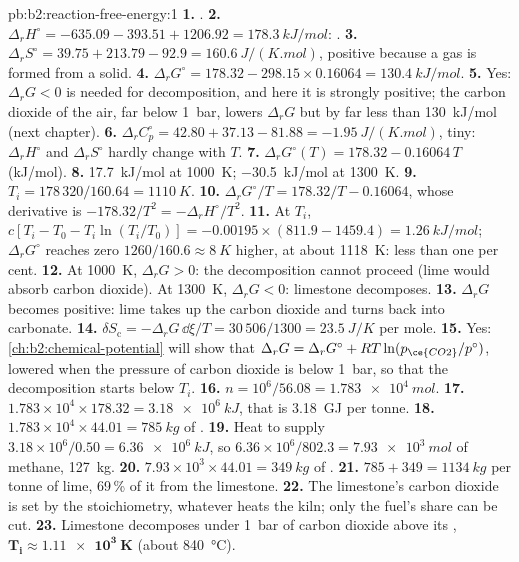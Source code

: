 \begin{solution}{pb:b2:reaction-free-energy:1}
\textbf{1.} .
\textbf{2.} $\Delta_r H^\circ = -635.09 - 393.51 + 1206.92 =
\qty{+178.3}{kJ/mol}$: .
\textbf{3.} $\Delta_r S^\circ = 39.75 + 213.79 - 92.9 = \qty{+160.6}{J/(K.mol)}$,
positive because a gas is formed from a solid.
\textbf{4.} $\Delta_r G^\circ = 178.32 - 298.15 \times 0.16064 =
\qty{+130.4}{kJ/mol}$.
\textbf{5.} Yes: $\Delta_r G < 0$ is needed for decomposition, and here it
is strongly positive; the carbon dioxide of the air, far below \qty{1}{bar},
lowers $\Delta_r G$ but by far less than \qty{130}{kJ/mol} (next chapter).
\textbf{6.} $\Delta_r C^\circ_p = 42.80 + 37.13 - 81.88 =
\qty{-1.95}{J/(K.mol)}$, tiny: $\Delta_r H^\circ$ and $\Delta_r S^\circ$
hardly change with $T$.
\textbf{7.} $\Delta_r G^\circ(T) = 178.32 - 0.16064\,T$ (\unit{kJ/mol}).
\textbf{8.} \qty{+17.7}{kJ/mol} at \qty{1000}{K}; \qty{-30.5}{kJ/mol} at
\qty{1300}{K}.
\textbf{9.} $T_i = 178\,320/160.64 = \qty{1110}{K}$.
\textbf{10.} $\Delta_r G^\circ/T = 178.32/T - 0.16064$, whose derivative is
$-178.32/T^2 = -\Delta_r H^\circ/T^2$.
\textbf{11.} At $T_i$, $c[T_i - T_0 - T_i\ln(T_i/T_0)] = -0.00195 \times
(811.9 - 1459.4) = \qty{+1.26}{kJ/mol}$; $\Delta_r G^\circ$ reaches zero
$1260/160.6 \approx \qty{8}{K}$ higher, at about \qty{1118}{K}: less than
one per cent.
\textbf{12.} At \qty{1000}{K}, $\Delta_r G > 0$: the decomposition cannot
proceed (lime would absorb carbon dioxide). At \qty{1300}{K}, $\Delta_r G <
0$: limestone decomposes.
\textbf{13.} $\Delta_r G$ becomes positive: lime takes up the carbon dioxide
and turns back into carbonate.
\textbf{14.} $\delta S_{\text{c}} = -\Delta_r G\,\dd\xi/T = 30\,506/1300 =
\qty{23.5}{J/K}$ per mole.
\textbf{15.} Yes: \cref{ch:b2:chemical-potential} will show that
$\Delta_r G = \Delta_r G^\circ + RT\ln(p_{\ce{CO2}}/p^\circ)$, lowered
when the pressure of carbon dioxide is below \qty{1}{bar}, so that the
decomposition starts below $T_i$.
\textbf{16.} $n = 10^6/56.08 = \qty{1.783e4}{mol}$.
\textbf{17.} $1.783 \times 10^4 \times 178.32 = \qty{3.18e6}{kJ}$, that is
\qty{3.18}{GJ} per tonne.
\textbf{18.} $1.783 \times 10^4 \times 44.01 = \qty{785}{kg}$ of .
\textbf{19.} Heat to supply $3.18 \times 10^6/0.50 = \qty{6.36e6}{kJ}$, so
$6.36 \times 10^6/802.3 = \qty{7.93e3}{mol}$ of methane, \qty{127}{kg}.
\textbf{20.} $7.93 \times 10^3 \times 44.01 = \qty{349}{kg}$ of .
\textbf{21.} $785 + 349 = \qty{1134}{kg}$ per tonne of lime, 69\,\% of it
from the limestone.
\textbf{22.} The limestone's carbon dioxide is set by the stoichiometry,
whatever heats the kiln; only the fuel's share can be cut.
\textbf{23.} Limestone decomposes under \qty{1}{bar} of carbon dioxide above
its , $\boldsymbol{T_i \approx \qty{1.11e3}{K}}$
(about \qty{840}{\celsius}).
\end{solution}

